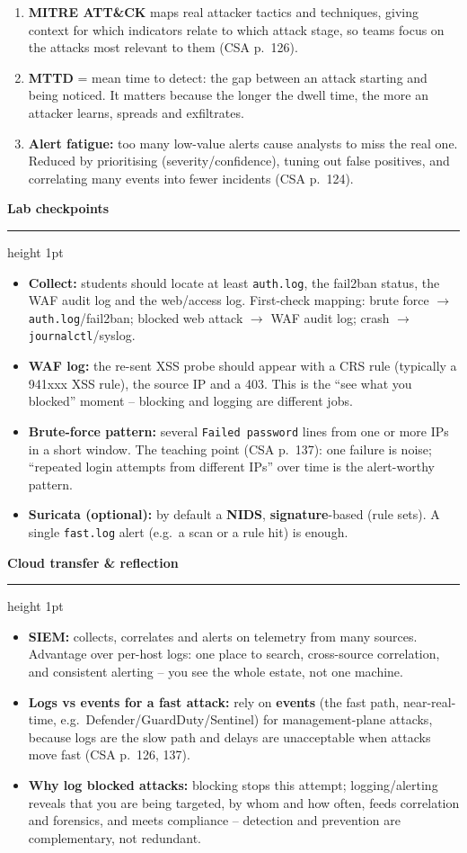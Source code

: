 \documentclass[11pt]{article}
\newcommand{\wbsection}[1]{\par\vspace{11pt}\noindent
  {\large\bfseries\color{kred}#1}\par\vspace{2pt}
  {\color{kred!35}\hrule height 1pt}\par\vspace{6pt}}
\renewcommand{\emph}[1]{\textup{#1}}
\newcommand{\cmd}[1]{\texttt{#1}}
\begin{document}
\begin{enumerate}
\item \textbf{MITRE ATT\&CK} maps real attacker tactics and techniques, giving context for which
      indicators relate to which attack stage, so teams focus on the attacks most relevant to them (CSA
      p.~126).
\item \textbf{MTTD} = mean time to detect: the gap between an attack starting and being noticed. It
      matters because the longer the dwell time, the more an attacker learns, spreads and exfiltrates.
\item \textbf{Alert fatigue:} too many low-value alerts cause analysts to miss the real one. Reduced by
      prioritising (severity/confidence), tuning out false positives, and correlating many events into
      fewer incidents (CSA p.~124).
\end{enumerate}

\wbsection{Lab checkpoints}
\begin{itemize}
\item \textbf{Collect:} students should locate at least \cmd{auth.log}, the fail2ban status, the WAF
      audit log and the web/access log. First-check mapping: brute force $\rightarrow$
      \cmd{auth.log}/fail2ban; blocked web attack $\rightarrow$ WAF audit log; crash $\rightarrow$
      \cmd{journalctl}/syslog.
\item \textbf{WAF log:} the re-sent XSS probe should appear with a CRS rule (typically a 941xxx XSS rule),
      the source IP and a 403. This is the ``see what you blocked'' moment -- blocking and logging are
      different jobs.
\item \textbf{Brute-force pattern:} several \cmd{Failed password} lines from one or more IPs in a short
      window. The teaching point (CSA p.~137): one failure is noise; ``repeated login attempts from
      different IPs'' over time is the alert-worthy pattern.
\item \textbf{Suricata (optional):} by default a \textbf{NIDS}, \textbf{signature}-based (rule sets). A
      single \cmd{fast.log} alert (e.g.\ a scan or a rule hit) is enough.
\end{itemize}

\wbsection{Cloud transfer \& reflection}
\begin{itemize}
\item \textbf{SIEM:} collects, \emph{correlates} and \emph{alerts} on telemetry from many sources.
      Advantage over per-host logs: one place to search, cross-source correlation, and consistent
      alerting -- you see the whole estate, not one machine.
\item \textbf{Logs vs events for a fast attack:} rely on \textbf{events} (the fast path, near-real-time,
      e.g.\ Defender/GuardDuty/Sentinel) for management-plane attacks, because logs are the slow path and
      delays are unacceptable when attacks move fast (CSA p.~126, 137).
\item \textbf{Why log blocked attacks:} blocking stops \emph{this} attempt; logging/alerting reveals that
      you are being targeted, by whom and how often, feeds correlation and forensics, and meets
      compliance -- detection and prevention are complementary, not redundant.
\end{itemize}
\end{document}
